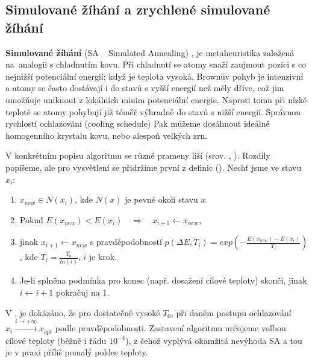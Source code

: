 \subsection{Simulované žíhání a zrychlené simulované žíhání}

\textbf{Simulované žíhání} (SA -- Simulated Annealing) \cite{SA Hajek}, \cite{SA Tsitsiklis} je metaheuristika založená na~analogii s chladnutím kovu. Při chladnutí se atomy snaží zaujmout pozici s co nejnižší potenciální energií; když je teplota vysoká, Brownův pohyb je intenzivní a atomy se často dostávají i do stavů s vyšší energií než měly dříve, což jim umožňuje uniknout z lokálních minim potenciální energie. Naproti tomu při nízké teplotě se atomy pohybují již téměř výhradně do stavů s nižší energií. Správnou rychlostí ochlazování (cooling schedule) Pak můžeme dosáhnout ideálně homogenního krystalu kovu, nebo alespoň velkých zrn.

V konkrétním popisu algoritmu se různé prameny liší (srov. \cite{SA Hajek}, \cite{VFSA}). Rozdíly popíšeme, ale pro vysvětlení se přidržíme první z definic (\cite{SA Hajek}). Nechť jsme ve stavu $x_i$:
\begin{enumerate}
  \item $x_{new} \in N(x_i)$, kde $N(x)$ je pevné okolí stavu $x$.
  \item Pokud $E(x_{new}) < E(x_i) \quad\Rightarrow\quad x_{i+1} \leftarrow x_{new}$,
  \item jinak $x_{i+1} \leftarrow x_{new}$ s pravděpodobností $p(\Delta E,T_i) = exp(-\frac{E(x_{new}) - E(x_i)}{T_i})$,
    \newline kde $T_i = \frac{T_0}{ln(i)}$, $i$ je krok.
  \item Je-li splněna podmínka pro konec (např. dosažení cílové teploty) skonči, jinak \linebreak $i\leftarrow i+1$ pokračuj na 1.
\end{enumerate}


V \cite{SA Hajek}, \cite{SA Tsitsiklis} je dokázáno, že pro dostatečně vysoké $T_0$, při daném postupu ochlazování $x_i \xrightarrow{i \to +\infty} x_{opt}$ podle pravděpodobnosti. Zastavení algoritmu určujeme volbou cílové teploty (běžně i řádu $10^{-4}$), z čehož vyplývá okamžitá nevýhoda SA a tou je v praxi příliš pomalý pokles teploty.

